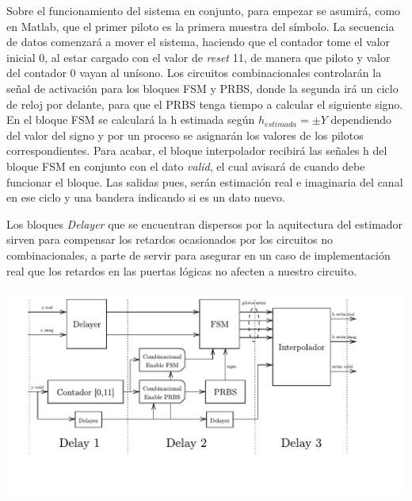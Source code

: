 \documentclass[11pt]{scrartcl} %
\begin{document}
\begin{preview}
Sobre el funcionamiento del sistema en conjunto, para empezar se asumirá, como en Matlab, que el primer piloto es la primera muestra del símbolo. La secuencia de datos comenzará a mover el sistema, haciendo que el contador tome el valor inicial 0, al estar cargado con el valor de \emph{reset} 11, de manera que piloto y valor del contador 0 vayan al unísono. Los circuitos combinacionales controlarán la señal de activación para los bloques FSM y PRBS, donde la segunda irá un ciclo de reloj por delante, para que el PRBS tenga tiempo a calcular el siguiente signo. En el bloque FSM se calculará la h estimada según $h_{estimada} = \pm Y$ dependiendo del valor del signo y por un proceso se asignarán los valores de los pilotos correspondientes. Para acabar, el bloque interpolador recibirá las señales h del bloque FSM en conjunto con el dato \emph{valid}, el cual avisará de cuando debe funcionar el bloque. Las salidas pues, serán estimación real e imaginaria del canal en ese ciclo y una bandera indicando si es un dato nuevo.

Los bloques \emph{Delayer} que se encuentran dispersos por la aquitectura del estimador sirven para compensar los retardos ocasionados por los circuitos no combinacionales, a parte de servir para asegurar en un caso de implementación real que los retardos en las puertas lógicas no afecten a nuestro circuito. 


\begin{minipage}{\linewidth}
	\begin{center}
		\includegraphics[width=1\columnwidth,trim={0 2cm 1cm 0},clip]{./Figures/DiagramaDelays.pdf} %
	\end{center}
	\label{delays}
\end{minipage}


\end{preview}
\end{document}

